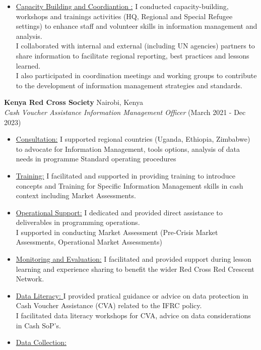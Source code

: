 \documentclass[line,margin,10pt]{res}
\begin{document}
\begin{resume}
\begin{itemize}
    \item \underline{Capacity Building and Coordiantion :}
    I conducted capacity-building, workshops and trainings activities (HQ, Regional and Special Refugee settings) to enhance staff and volunteer skills in information management and analysis.\\
    I collaborated with internal and external (including UN agencies) partners to share information to facilitate regional reporting, best practices and lessons learned.\\
    I also participated in coordination meetings and working groups to contribute to the development of information management strategies and standards.

\end{itemize}

\textbf{Kenya Red Cross Society} \hfill Nairobi, Kenya\\
{\sl Cash Voucher Assistance Information Management Officer} \hfill (March 2021 - Dec 2023)
\begin{itemize} \itemsep -2pt
	\item \underline{Consultation:}
    I supported regional countries (Uganda, Ethiopia, Zimbabwe) to advocate for Information Management, tools options, analysis of data needs in programme Standard operating procedures
    \item \underline{Training:}
    I facilitated and supported in providing training to introduce concepts and Training for Specific Information Management skills in cash context including Market Assessments.
    \item \underline{Operational Support:}
    I dedicated and provided direct assistance to deliverables in programming operations.\\
    I supported in conducting Market Assessment (Pre-Crisis Market Assessments, Operational Market Assessments)\\
    \item \underline{Monitoring and Evaluation:}
    I facilitated and provided support during lesson learning and experience sharing to benefit the wider Red Cross Red Crescent Network.
    \item \underline{Data Literacy: }
    I provided pratical guidance or advice on data protection in Cash Voucher Assistance (CVA) related to the IFRC policy.\\
    I facilitated data literacy workshops for CVA, advice on data considerations in Cash SoP's.\\
    \item \underline{Data Collection: }

\end{itemize}
\end{resume}
\end{document}
